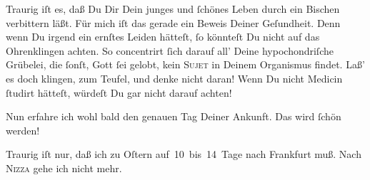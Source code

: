 \pstart
           Traurig iſt es, daß Du Dir Dein junges und{ }ſchönes Leben  durch ein Bischen \label{K_L02806-3v}\label{K_L02806-3} verbittern läßt. Für mich iſt das gerade ein Beweis Deiner {\pb} Geſundheit. Denn wenn Du irgend ein ernſtes Leiden hätteſt,{ }ſo könnteſt Du
               nicht auf das Ohrenklingen achten. So concentrirt{ }ſich darauf all’  Deine hypochondriſche Grübelei, die{ }ſonſt, Gott{ }ſei gelobt, kein \textsc{Sujet} in Deinem Organismus findet. Laß’ es doch klingen, zum
               Teufel, und denke nicht daran! Wenn Du nicht Medicin{ }ſtudirt hätteſt, würdeſt Du gar
               nicht darauf achten!\pend
           
\pstart
            Nun erfahre ich wohl bald den genauen Tag Deiner Ankunft. {\pb}Das wird{ }ſchön werden! \strikeout{\textcolor{gray}{×}\-\textcolor{gray}{×}\-\textcolor{gray}{×}}\pend
           
\pstart
           Traurig iſt nur, daß ich zu Oſtern auf 10 bis 14 Tage
               nach Frankfurt muß. Nach \textsc{Nizza} gehe ich nicht mehr.\pend
           
